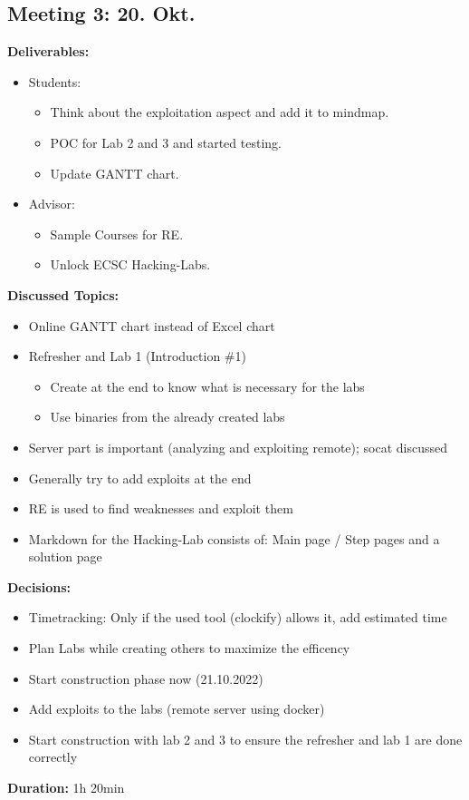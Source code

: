 \subsection*{Meeting 3: 20. Okt.}
\textbf{Deliverables:} 
\begin{itemize}
    \item Students:
    \begin{itemize}
        \item Think about the exploitation aspect and add it to mindmap.
        \item POC for Lab 2 and 3 and started testing.
        \item Update GANTT chart.
    \end{itemize}
    \item Advisor:
    \begin{itemize}
        \item Sample Courses for RE.
        \item Unlock ECSC Hacking-Labs. 
    \end{itemize}
\end{itemize}
\textbf{Discussed Topics:} 
\begin{itemize}
    \item Online GANTT chart instead of Excel chart
    \item Refresher and Lab 1 (Introduction \#1)
    \begin{itemize}
        \item Create at the end to know what is necessary for the labs
        \item Use binaries from the already created labs
    \end{itemize}
    \item Server part is important (analyzing and exploiting remote); socat discussed
    \item Generally try to add exploits at the end
    \item RE is used to find weaknesses and exploit them
    \item Markdown for the Hacking-Lab consists of: Main page / Step pages and a solution page
\end{itemize}
\textbf{Decisions:}
\begin{itemize}
    \item Timetracking: Only if the used tool (clockify) allows it, add estimated time
    \item Plan Labs while creating others to maximize the efficency
    \item Start construction phase now (21.10.2022)
    \item Add exploits to the labs (remote server using docker)
    \item Start construction with lab 2 and 3 to ensure the refresher and lab 1 are done correctly
\end{itemize}
\textbf{Duration:} 1h 20min

